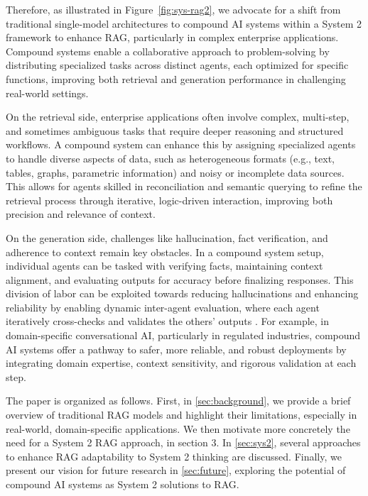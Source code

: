 Therefore, as illustrated in Figure~\ref{fig:sys-rag2}, we advocate for a shift from traditional single-model architectures to compound AI systems within a System 2 framework to enhance RAG, particularly in complex enterprise applications. Compound systems enable a collaborative approach to problem-solving by distributing specialized tasks across distinct agents, each optimized for specific functions, improving both retrieval and generation performance in challenging real-world settings.

On the retrieval side, enterprise applications often involve complex, multi-step, and sometimes ambiguous tasks that require deeper reasoning and structured workflows. A compound system can enhance this by assigning specialized agents to handle diverse aspects of data, such as heterogeneous formats (e.g., text, tables, graphs, parametric information) and noisy or incomplete data sources. This allows for agents skilled in reconciliation and semantic querying to refine the retrieval process through iterative, logic-driven interaction, improving both precision and relevance of context.

On the generation side, challenges like hallucination, fact verification, and adherence to context remain key obstacles. In a compound system setup, individual agents can be tasked with verifying facts, maintaining context alignment, and evaluating outputs for accuracy before finalizing responses. This division of labor can be exploited towards reducing hallucinations and enhancing reliability by enabling dynamic inter-agent evaluation, where each agent iteratively cross-checks and validates the others' outputs \cite{zhang2021survey,carlson2010toward}. For example, in domain-specific conversational AI, particularly in regulated industries, compound AI systems offer a pathway to safer, more reliable, and robust deployments by integrating domain expertise, context sensitivity, and rigorous validation at each step. 


The paper is organized as follows. First, in \cref{sec:background}, we provide a brief overview of traditional RAG models and highlight their limitations, especially in real-world, domain-specific applications. We then motivate more concretely the need for a System 2 RAG approach, in section 3. In \cref{sec:sys2}, several approaches to enhance RAG adaptability to System 2 thinking are discussed. Finally, we present our vision for future research in \cref{sec:future}, exploring the potential of compound AI systems as System 2 solutions to RAG.

